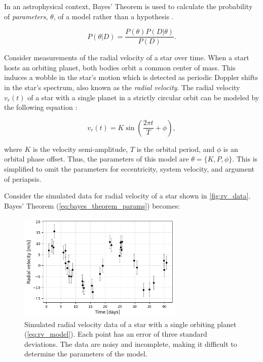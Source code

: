 \documentclass[preprint,longauthor]{aastex631}
\numberwithin{equation}{section}
\begin{document}
In an astrophysical context, Bayes' Theorem is used to calculate the probability of \textit{parameters}, $\theta$, of a model rather than a hypothesis \citep{brewer1BayesianInference2018}.

\begin{equation}
  P(\theta|D) = \frac{P(\theta)P(D|\theta)}{P(D)}.
  \label{eq:bayes_theorem_params}
\end{equation}

Consider measurements of the radial velocity of a star over time. When a start hosts an orbiting planet, both bodies orbit a common center of mass. This induces a wobble in the star's motion which is detected as periodic Doppler shifts in the star's spectrum, also known as the \textit{radial velocity}. The radial velocity $v_r(t)$ of a star with a single planet in a strictly circular orbit can be modeled by the following equation \citep{lovisRadialVelocityTechniques2010}:

\begin{equation}
  v_r(t) = K \sin\left(\frac{2\pi t}{T} + \phi\right),
  \label{eq:rv_model}
\end{equation}

where $K$ is the velocity semi-amplitude, $T$ is the orbital period, and $\phi$ is an orbital phase offset. Thus, the parameters of this model are $\theta = \{K,P,\phi\}$. This is simplified to omit the parameters for eccentricity, system velocity, and argument of periapsis.

Consider the simulated data for radial velocity of a star shown in \autoref{fig:rv_data}. Bayes' Theorem (\autoref{eq:bayes_theorem_params}) becomes:

\begin{figure}[ht!]
\centering
\includegraphics[width=0.7\textwidth]{../scripts/2.2/figures/data.png}
\caption{Simulated radial velocity data of a star with a single orbiting planet (\autoref{eq:rv_model}). Each point has an error of three standard deviations. The data are noisy and incomplete, making it difficult to determine the parameters of the model.}
\label{fig:rv_data}
\end{figure}
\end{document}
